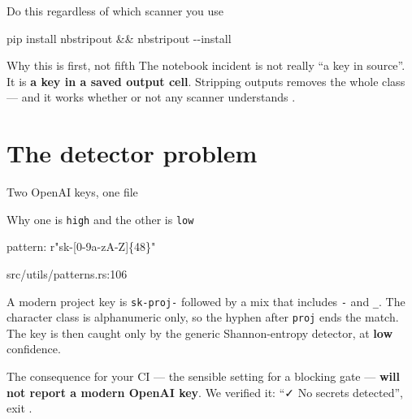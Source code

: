 \documentclass[aspectratio=169,10pt]{beamer}
\begin{document}
\begin{frame}{Do this regardless of which scanner you use}
  \begin{center}\large\ttfamily
  pip install nbstripout \&\& nbstripout -{}-install
  \end{center}

  \vspace{1em}
  \begin{block}{Why this is first, not fifth}
    The notebook incident is not really ``a key in source''. It is
    \textbf{a key in a saved output cell}. Stripping outputs removes the whole
    class --- and it works whether or not any scanner understands
    .
  \end{block}

  \vspace{0.8em}
\end{frame}

\section{The detector problem}

\begin{frame}[fragile]{Two OpenAI keys, one file}
\end{frame}

\begin{frame}{Why one is \texttt{high} and the other is \texttt{low}}
  \begin{center}\ttfamily\small
  pattern: r"sk-[0-9a-zA-Z]\{48\}"
  \end{center}
  \begin{center}\footnotesize\textcolor{evnxMuted}{src/utils/patterns.rs:106}\end{center}

  \vspace{0.8em}
  A modern project key is \texttt{sk-proj-} followed by a mix that includes
  \texttt{-} and \texttt{\_}. The character class is alphanumeric only, so the
  hyphen after \texttt{proj} ends the match. The key is then caught only by the
  generic Shannon-entropy detector, at \textbf{low} confidence.

  \vspace{0.8em}
  \begin{trap}{The consequence for your CI}
     --- the sensible setting for a blocking
    gate --- \textbf{will not report a modern OpenAI key}. We verified it:
    ``✓ No secrets detected'', exit \exitzero.
  \end{trap}
\end{frame}
\end{document}
